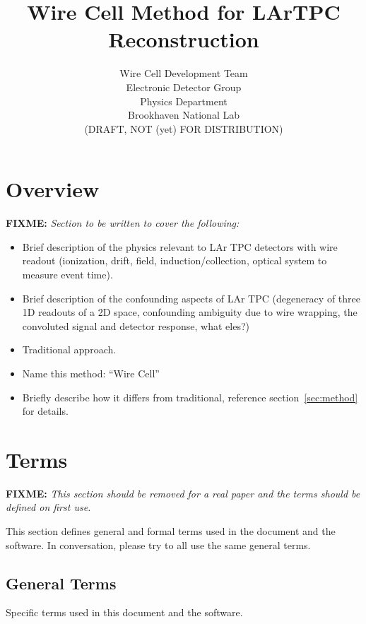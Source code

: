 \documentclass[letter]{article}
\title{Wire Cell Method for LArTPC Reconstruction}
\author{Wire Cell Development Team\\Electronic Detector
  Group\\Physics Department\\Brookhaven National Lab\\(DRAFT, NOT (yet) FOR DISTRIBUTION)}
\newcommand\fixme[1]{\textbf{FIXME:} \textit{#1}\xspace}
\begin{document}
\maketitle

\section{Overview}

\fixme{Section to be written to cover the following:}

\begin{itemize}
\item Brief description of the physics relevant to LAr TPC detectors
  with wire readout (ionization, drift, field, induction/collection,
  optical system to measure event time).
\item Brief description of the confounding aspects of LAr TPC
  (degeneracy of three 1D readouts of a 2D space, confounding
  ambiguity due to wire wrapping, the convoluted signal and detector
  response, what eles?)
\item Traditional approach.
\item Name this method: ``Wire Cell''
\item Briefly describe how it differs from traditional, reference
  section~\ref{sec:method} for details.
\end{itemize}

\section{Terms}

\fixme{This section should be removed for a real paper and the terms
  should be defined on first use.}

This section defines general and formal terms used in the document and
the software.
In conversation, please try to all use the same general terms.

\subsection{General Terms}

Specific terms used in this document and the software.
\end{document}
